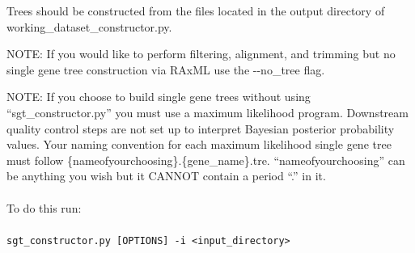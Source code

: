 \documentclass{article}
\def\code#1{\texttt{#1}}
\begin{document}
\begin{enumerate}[itemsep=12pt]
     Trees should be constructed from the files located in the output directory of working\_dataset\_constructor.py.
    
    NOTE: If you would like to perform filtering, alignment, and trimming but no single gene tree construction via RAxML use the -\/-no\_tree flag.
    
    NOTE: If you choose to build single gene trees without using “sgt\_constructor.py” you must use a maximum likelihood program. Downstream quality control steps are not set up to interpret Bayesian posterior probability values. Your naming convention for each maximum likelihood single gene tree must follow \{nameofyourchoosing\}.\{gene\_name\}.tre. “nameofyourchoosing” can be anything you wish but it CANNOT contain a period “.” in it.
    \\\\
    To do this run:
    \\\\
    \code{sgt\_constructor.py [OPTIONS] -i <input\_directory>}
    \vspace{0.2cm}
    

\end{enumerate}
\end{document}
